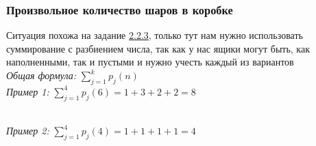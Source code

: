 \documentclass{article}
\begin{document}
            \subsubsection{Произвольное количество шаров в коробке}
                Ситуация похожа на задание \hyperlink{2b3}{2.2.3}, только тут нам нужно использовать суммирование с разбиением числа, так как у нас ящики могут быть, как наполненными, так и пустыми и нужно учесть каждый из вариантов\\
                \textit{Общая формула:} $ \sum\limits_{j=1}^{k} p_j(n) $\\
                \textit{Пример 1:} $ \sum\limits_{j=1}^{4} p_j(6) = 1 + 3 + 2 + 2 = 8 $
                \begin{figure}[h!]
                \end{figure}\\
                \textit{Пример 2:} $ \sum\limits_{j=1}^{4} p_j(4) = 1 + 1 + 1 + 1 = 4 $
                \begin{figure}[h!]
                \end{figure}
\end{document}
